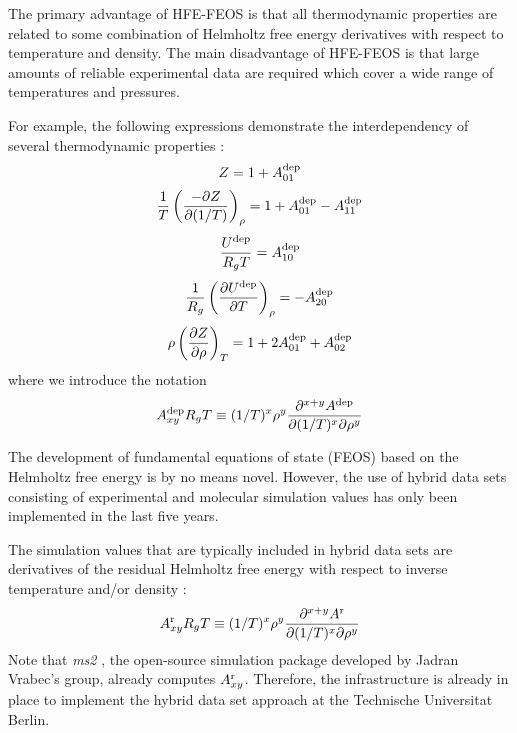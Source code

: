 \documentclass[11pt,a4paper]{article}
\begin{document}

The primary advantage of HFE-FEOS is that all thermodynamic properties are related to some combination of Helmholtz free energy derivatives with respect to temperature and density. The main disadvantage of HFE-FEOS is that large amounts of reliable experimental data are required which cover a wide range of temperatures and pressures. 

For example, the following expressions demonstrate the interdependency of several thermodynamic properties \cite{Rutkai2015}:
\begin{equation} \label{eq:Z}
Z = 1 + A_{01}^{\rm dep}
\end{equation}
\begin{equation} \label{eq:Z_IC}
\frac{1}{T} \left(\frac{-\partial Z}{\partial(1/T)}\right)_\rho = 1 + A_{01}^{\rm dep} - A_{11}^{\rm dep}
\end{equation}
\begin{equation} \label{eq:U}
\frac{U^{\rm dep}}{R_gT} = A_{10}^{\rm dep}
\end{equation}
\begin{equation} \label{eq:U_IC}
\frac{1}{R_g} \left(\frac{\partial U^{\rm dep}}{\partial T}\right)_\rho = -A_{20}^{\rm dep} 
\end{equation} 
\begin{equation} \label{eq:Z_IT}
\rho \left(\frac{\partial Z}{\partial \rho}\right)_T = 1 + 2 A_{01}^{\rm dep} + A_{02}^{\rm dep} 
\end{equation}
where we introduce the notation 
\begin{equation} \label{Residual Derivatives}
A_{xy}^{\rm dep} R_gT \equiv (1/T)^x\rho^y \frac{\partial^{x+y}A^{\rm dep}}{\partial(1/T)^x \partial \rho^y}
\end{equation}

The development of fundamental equations of state (FEOS) based on the Helmholtz free energy is by no means novel. However, the use of hybrid data sets consisting of experimental and molecular simulation values has only been implemented in the last five years. 

The simulation values that are typically included in hybrid data sets are derivatives of the residual Helmholtz free energy with respect to inverse temperature and/or density \cite{Thol2016_siloxane_first,Thol2016_siloxane,Thol2017,Rutkai2013,Thol2015}:
\begin{equation} \label{Residual Derivatives}
A_{xy}^{\rm r} R_gT \equiv (1/T)^x\rho^y \frac{\partial^{x+y}A^{\rm r}}{\partial(1/T)^x \partial \rho^y}
\end{equation}
Note that \textit{ms2} \cite{ms2}, the open-source simulation package developed by Jadran Vrabec's group, already computes $A_{xy}^{\rm r}$. Therefore, the infrastructure is already in place to implement the hybrid data set approach at the Technische Universitat Berlin.
   
\end{document}
